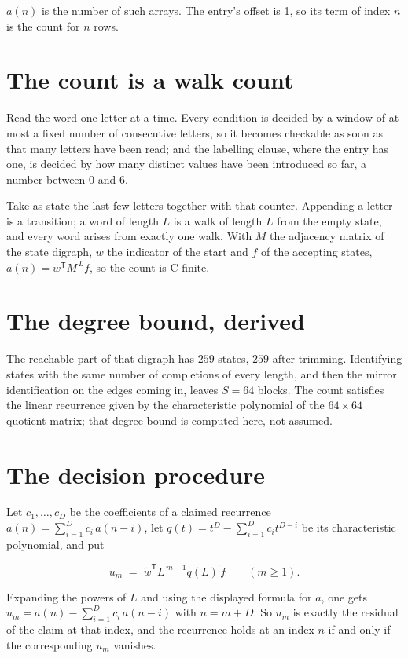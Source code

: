 \documentclass[11pt]{article}
\theoremstyle{definition}
\begin{document}
$a(n)$ is the number of such arrays. The entry's offset is 1, so its term of index $n$ is the count for $n$ rows.

\section{The count is a walk count}

Read the word one letter at a time. Every condition is decided by a window of at most a fixed number of consecutive letters, so it becomes checkable as soon as that many letters have been read; and the labelling clause, where the entry has one, is decided by how many distinct values have been introduced so far, a number between $0$ and 6.

Take as state the last few letters together with that counter. Appending a letter is a transition; a word of length $L$ is a walk of length $L$ from the empty state, and every word arises from exactly one walk. With $M$ the adjacency matrix of the state digraph, $w$ the indicator of the start and $f$ of the accepting states, $a(n) = w^{\mathsf T}M^{\,L}f$, so the count is C-finite.

\section{The degree bound, derived}

The reachable part of that digraph has $259$ states, $259$ after trimming. Identifying states with the same number of completions of every length, and then the mirror identification on the edges coming in, leaves $S = 64$ blocks. The count satisfies the linear recurrence given by the characteristic polynomial of the $64\times64$ quotient matrix; that degree bound is computed here, not assumed.

\section{The decision procedure}

Let $c_1,\dots,c_D$ be the coefficients of a claimed recurrence $a(n) = \sum_{i=1}^{D} c_i\,a(n-i)$, let $q(t) = t^{D} - \sum_{i=1}^{D} c_i t^{D-i}$ be its characteristic polynomial, and put

\[u_m \;=\; \tilde w^{\mathsf T} L^{\,m-1} q(L)\,\tilde f \qquad (m \ge 1).\]

Expanding the powers of $L$ and using the displayed formula for $a$, one gets $u_m = a(n) - \sum_{i=1}^{D} c_i\,a(n-i)$ with $n = m + D$. So $u_m$ is exactly the residual of the claim at that index, and the recurrence holds at an index $n$ if and only if the corresponding $u_m$ vanishes.
\end{document}
